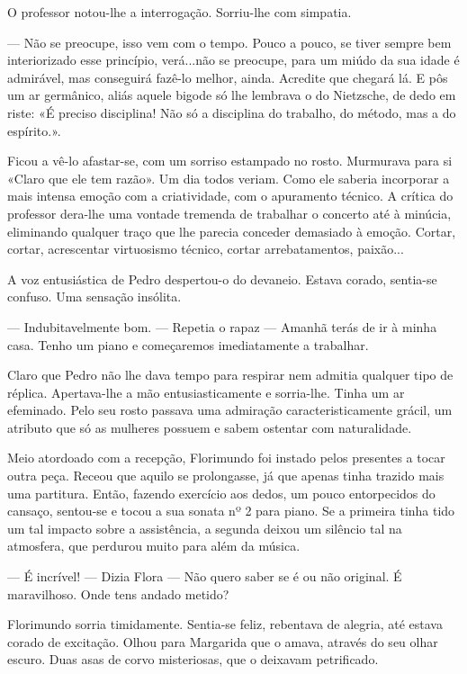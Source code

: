 O professor notou-lhe a interrogação. Sorriu-lhe com simpatia.

--- Não se preocupe, isso vem com o tempo. Pouco a pouco, se tiver sempre
bem interiorizado esse princípio, verá...não se preocupe, para um miúdo
da sua idade é admirável, mas conseguirá fazê-lo melhor, ainda. Acredite
que chegará lá. E pôs um ar germânico, aliás aquele bigode só lhe
lembrava o do Nietzsche, de dedo em riste: «É preciso disciplina! Não só
a disciplina do trabalho, do método, mas a do espírito.».

Ficou a vê-lo afastar-se, com um sorriso estampado no rosto. Murmurava
para si «Claro que ele tem razão». Um dia todos veriam. Como ele saberia
incorporar a mais intensa emoção com a criatividade, com o apuramento
técnico. A crítica do professor dera-lhe uma vontade tremenda de
trabalhar o concerto até à minúcia, eliminando qualquer traço que lhe
parecia conceder demasiado à emoção. Cortar, cortar, acrescentar
virtuosismo técnico, cortar arrebatamentos, paixão...

A voz entusiástica de Pedro despertou-o do devaneio. Estava corado,
sentia-se confuso. Uma sensação insólita.

--- Indubitavelmente bom. --- Repetia o rapaz --- Amanhã terás de ir à minha
casa. Tenho um piano e começaremos imediatamente a trabalhar.

Claro que Pedro não lhe dava tempo para respirar nem admitia qualquer
tipo de réplica. Apertava-lhe a mão entusiasticamente e sorria-lhe.
Tinha um ar efeminado. Pelo seu rosto passava uma admiração
caracteristicamente grácil, um atributo que só as mulheres possuem e
sabem ostentar com naturalidade.

Meio atordoado com a recepção, Florimundo foi instado pelos presentes a
tocar outra peça. Receou que aquilo se prolongasse, já que apenas tinha
trazido mais uma partitura. Então, fazendo exercício aos dedos, um pouco
entorpecidos do cansaço, sentou-se e tocou a sua sonata nº 2 para piano.
Se a primeira tinha tido um tal impacto sobre a assistência, a segunda
deixou um silêncio tal na atmosfera, que perdurou muito para além da
música.

--- É incrível! --- Dizia Flora --- Não quero saber se é ou não original. É
maravilhoso. Onde tens andado metido?

Florimundo sorria timidamente. Sentia-se feliz, rebentava de alegria,
até estava corado de excitação. Olhou para Margarida que o amava,
através do seu olhar escuro. Duas asas de corvo misteriosas, que o
deixavam petrificado.

